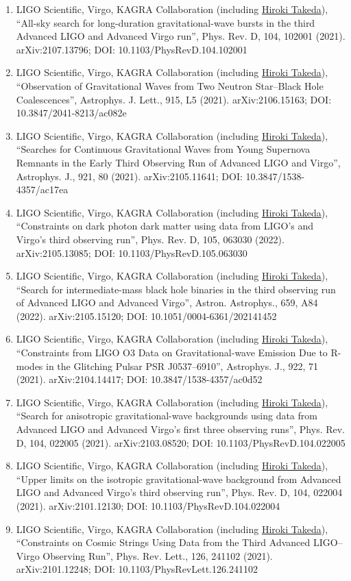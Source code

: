 \documentclass[uplatex, 12pt]{article}
\begin{document}
\begin{enumerate}
\item LIGO Scientific, Virgo, KAGRA Collaboration (including \uline{Hiroki Takeda}), “All-sky search for long-duration gravitational-wave bursts in the third Advanced LIGO and Advanced Virgo run”, Phys. Rev. D, 104, 102001 (2021). arXiv:2107.13796; DOI: 10.1103/PhysRevD.104.102001
\item LIGO Scientific, Virgo, KAGRA Collaboration (including \uline{Hiroki Takeda}), “Observation of Gravitational Waves from Two Neutron Star–Black Hole Coalescences”, Astrophys. J. Lett., 915, L5 (2021). arXiv:2106.15163; DOI: 10.3847/2041-8213/ac082e
\item LIGO Scientific, Virgo, KAGRA Collaboration (including \uline{Hiroki Takeda}), “Searches for Continuous Gravitational Waves from Young Supernova Remnants in the Early Third Observing Run of Advanced LIGO and Virgo”, Astrophys. J., 921, 80 (2021). arXiv:2105.11641; DOI: 10.3847/1538-4357/ac17ea
\item LIGO Scientific, Virgo, KAGRA Collaboration (including \uline{Hiroki Takeda}), “Constraints on dark photon dark matter using data from LIGO's and Virgo's third observing run”, Phys. Rev. D, 105, 063030 (2022). arXiv:2105.13085; DOI: 10.1103/PhysRevD.105.063030
\item LIGO Scientific, Virgo, KAGRA Collaboration (including \uline{Hiroki Takeda}), “Search for intermediate-mass black hole binaries in the third observing run of Advanced LIGO and Advanced Virgo”, Astron. Astrophys., 659, A84 (2022). arXiv:2105.15120; DOI: 10.1051/0004-6361/202141452
\item LIGO Scientific, Virgo, KAGRA Collaboration (including \uline{Hiroki Takeda}), “Constraints from LIGO O3 Data on Gravitational-wave Emission Due to R-modes in the Glitching Pulsar PSR J0537–6910”, Astrophys. J., 922, 71 (2021). arXiv:2104.14417; DOI: 10.3847/1538-4357/ac0d52
\item LIGO Scientific, Virgo, KAGRA Collaboration (including \uline{Hiroki Takeda}), “Search for anisotropic gravitational-wave backgrounds using data from Advanced LIGO and Advanced Virgo's first three observing runs”, Phys. Rev. D, 104, 022005 (2021). arXiv:2103.08520; DOI: 10.1103/PhysRevD.104.022005
\item LIGO Scientific, Virgo, KAGRA Collaboration (including \uline{Hiroki Takeda}), “Upper limits on the isotropic gravitational-wave background from Advanced LIGO and Advanced Virgo's third observing run”, Phys. Rev. D, 104, 022004 (2021). arXiv:2101.12130; DOI: 10.1103/PhysRevD.104.022004
\item LIGO Scientific, Virgo, KAGRA Collaboration (including \uline{Hiroki Takeda}), “Constraints on Cosmic Strings Using Data from the Third Advanced LIGO–Virgo Observing Run”, Phys. Rev. Lett., 126, 241102 (2021). arXiv:2101.12248; DOI: 10.1103/PhysRevLett.126.241102

\end{enumerate}
\end{document}
